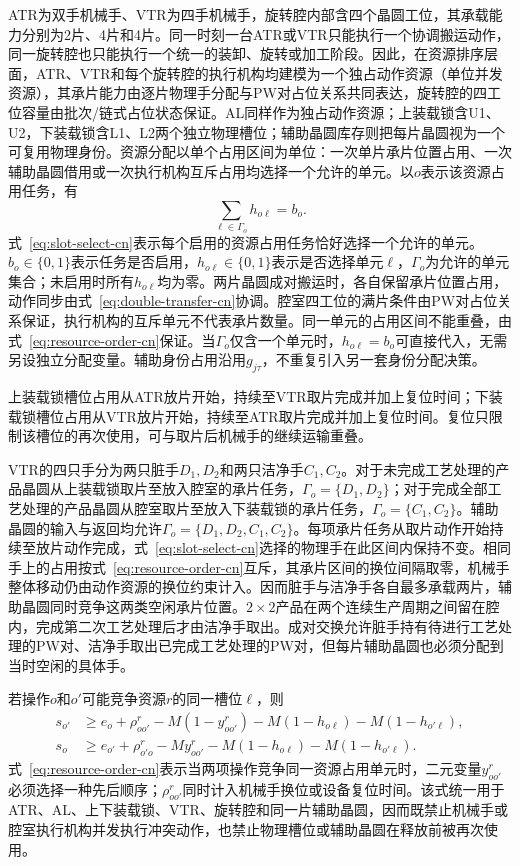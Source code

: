 \documentclass[final,5p,times,twocolumn]{elsarticle}
\begin{document}
ATR为双手机械手、VTR为四手机械手，旋转腔内部含四个晶圆工位，其承载能力分别为2片、4片和4片。同一时刻一台ATR或VTR只能执行一个协调搬运动作，同一旋转腔也只能执行一个统一的装卸、旋转或加工阶段。因此，在资源排序层面，ATR、VTR和每个旋转腔的执行机构均建模为一个独占动作资源（单位并发资源），其承片能力由逐片物理手分配与PW对占位关系共同表达，旋转腔的四工位容量由批次/链式占位状态保证。AL同样作为独占动作资源；上装载锁含U1、U2，下装载锁含L1、L2两个独立物理槽位；辅助晶圆库存则把每片晶圆视为一个可复用物理身份。资源分配以单个占用区间为单位：一次单片承片位置占用、一次辅助晶圆借用或一次执行机构互斥占用均选择一个允许的单元。以$o$表示该资源占用任务，有
\begin{equation}
\sum_{\ell\in\Gamma_o}h_{o\ell}=b_o.
\label{eq:slot-select-cn}
\end{equation}
式~\eqref{eq:slot-select-cn}表示每个启用的资源占用任务恰好选择一个允许的单元。$b_o\in\{0,1\}$表示任务是否启用，$h_{o\ell}\in\{0,1\}$表示是否选择单元$\ell$，$\Gamma_o$为允许的单元集合；未启用时所有$h_{o\ell}$均为零。两片晶圆成对搬运时，各自保留承片位置占用，动作同步由式~\eqref{eq:double-transfer-cn}协调。腔室四工位的满片条件由PW对占位关系保证，执行机构的互斥单元不代表承片数量。同一单元的占用区间不能重叠，由式~\eqref{eq:resource-order-cn}保证。当$\Gamma_o$仅含一个单元时，$h_{o\ell}=b_o$可直接代入，无需另设独立分配变量。辅助身份占用沿用$g_{j\tau}$，不重复引入另一套身份分配决策。

上装载锁槽位占用从ATR放片开始，持续至VTR取片完成并加上复位时间；下装载锁槽位占用从VTR放片开始，持续至ATR取片完成并加上复位时间。复位只限制该槽位的再次使用，可与取片后机械手的继续运输重叠。

VTR的四只手分为两只脏手$D_1,D_2$和两只洁净手$C_1,C_2$。对于未完成工艺处理的产品晶圆从上装载锁取片至放入腔室的承片任务，$\Gamma_o=\{D_1,D_2\}$；对于完成全部工艺处理的产品晶圆从腔室取片至放入下装载锁的承片任务，$\Gamma_o=\{C_1,C_2\}$。辅助晶圆的输入与返回均允许$\Gamma_o=\{D_1,D_2,C_1,C_2\}$。每项承片任务从取片动作开始持续至放片动作完成，式~\eqref{eq:slot-select-cn}选择的物理手在此区间内保持不变。相同手上的占用按式~\eqref{eq:resource-order-cn}互斥，其承片区间的换位间隔取零，机械手整体移动仍由动作资源的换位约束计入。因而脏手与洁净手各自最多承载两片，辅助晶圆同时竞争这两类空闲承片位置。$2\times2$产品在两个连续生产周期之间留在腔内，完成第二次工艺处理后才由洁净手取出。成对交换允许脏手持有待进行工艺处理的PW对、洁净手取出已完成工艺处理的PW对，但每片辅助晶圆也必须分配到当时空闲的具体手。

若操作$o$和$o'$可能竞争资源$r$的同一槽位$\ell$，则
\begin{equation}
\begin{aligned}
s_{o'}&\ge e_o+\rho^r_{oo'}-M(1-y^r_{oo'})
-M(1-h_{o\ell})-M(1-h_{o'\ell}),\\
s_o&\ge e_{o'}+\rho^r_{o'o}-My^r_{oo'}
-M(1-h_{o\ell})-M(1-h_{o'\ell}).
\end{aligned}
\label{eq:resource-order-cn}
\end{equation}
式~\eqref{eq:resource-order-cn}表示当两项操作竞争同一资源占用单元时，二元变量$y^r_{oo'}$必须选择一种先后顺序；$\rho^r_{oo'}$同时计入机械手换位或设备复位时间。该式统一用于ATR、AL、上下装载锁、VTR、旋转腔和同一片辅助晶圆，因而既禁止机械手或腔室执行机构并发执行冲突动作，也禁止物理槽位或辅助晶圆在释放前被再次使用。
\end{document}
